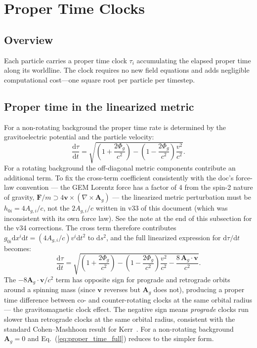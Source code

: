 \documentclass[11pt,a4paper]{article}
\newcommand{\vv}[1]{\mathbf{#1}}
\newcommand{\Phig}{\Phi_g}
\newcommand{\Ag}{\vv{A}_g}
\newcommand{\dd}{\mathrm{d}}
\begin{document}
\section{Proper Time Clocks}
\label{sec:proptime}

\subsection{Overview}

Each particle carries a proper time clock $\tau_i$ accumulating the elapsed proper time along its worldline.  The clock requires no new field equations and adds negligible computational cost---one square root per particle per timestep.

\subsection{Proper time in the linearized metric}

For a non-rotating background the proper time rate is determined by the gravitoelectric potential and the particle velocity:
\begin{equation}
  \frac{\dd\tau}{\dd t} = \sqrt{\left(1+\frac{2\Phig}{c^2}\right) - \left(1-\frac{2\Phig}{c^2}\right)\frac{v^2}{c^2}}.
\end{equation}
For a rotating background the off-diagonal metric components contribute an
additional term.  To fix the cross-term coefficient consistently with the
doc's force-law convention --- the GEM Lorentz force has a factor of 4 from
the spin-2 nature of gravity, $\vv{F}/m \supset 4\vv{v}\times(\nabla\times\Ag)$
--- the linearized metric perturbation must be $h_{0i} = 4A_{g,i}/c$, not
the $2A_{g,i}/c$ written in v33 of this document (which was inconsistent with
its own force law).  See the note at the end of this subsection for the
v34 corrections.  The cross term therefore contributes
$g_{0i}\dd x^i\dd t = (4A_{g,i}/c)v^i\dd t^2$ to $\dd s^2$, and the full
linearized expression for $\dd\tau/\dd t$ becomes:
\begin{equation}
\label{eq:proper_time_full}
  \frac{\dd\tau}{\dd t} = \sqrt{\left(1+\frac{2\Phig}{c^2}\right) - \left(1-\frac{2\Phig}{c^2}\right)\frac{v^2}{c^2} - \frac{8\,\Ag\cdot\vv{v}}{c^2}}.
\end{equation}
The $-8\Ag\cdot\vv{v}/c^2$ term has opposite sign for prograde and retrograde orbits around a spinning mass (since $\vv{v}$ reverses but $\Ag$ does not), producing a proper time difference between co- and counter-rotating clocks at the same orbital radius --- the gravitomagnetic clock effect.  The negative sign means \emph{prograde} clocks run slower than retrograde clocks at the same orbital radius, consistent with the standard Cohen--Mashhoon result for Kerr~\cite{CohenMashhoon1993,Mashhoon2003}.  For a non-rotating background $\Ag = 0$ and Eq.~(\ref{eq:proper_time_full}) reduces to the simpler form.
\end{document}
